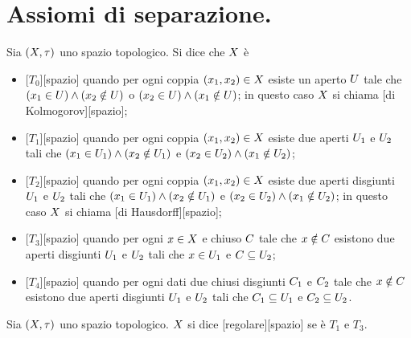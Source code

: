 \section{Assiomi di separazione.}\label{AssiomiDiSeparazione}
\begin{Axiom}
	Sia $(X,\tau)$ uno spazio topologico.
	Si dice che $X$ \`e
	\begin{itemize}
		\item {}[$T_0$][spazio]
		quando per ogni coppia $(x_1,x_2) \in
		X$ esiste un aperto $U$ tale che
		$\left ( x_1 \in U \right ) \wedge \left ( x_2 \notin U \right )$ o
		$\left ( x_2 \in U \right ) \wedge \left ( x_1 \notin U \right )$; in questo
		caso $X$ si chiama
		[di Kolmogorov][spazio];
		\item {}[$T_1$][spazio]
		quando per ogni coppia $(x_1,x_2) \in
		X$ esiste due aperti $U_1$ e $U_2$
		tali che
		$\left ( x_1 \in U_1 \right ) \wedge \left ( x_2 \notin U_1 \right )$ e
		$\left ( x_2 \in U_2 \right ) \wedge \left ( x_1 \notin U_2 \right )$;
		\item {}[$T_2$][spazio]
		quando per ogni coppia $(x_1,x_2) \in
		X$ esiste due aperti disgiunti $U_1$ e
		$U_2$ tali che
		$\left ( x_1 \in U_1 \right ) \wedge \left ( x_2 \notin U_1 \right )$ e
		$\left ( x_2 \in U_2 \right ) \wedge \left ( x_1 \notin U_2 \right )$; in questo
		caso $X$ si chiama
		[di Hausdorff][spazio];
		\item {}[$T_3$][spazio] quando per ogni
		$x \in X$ e chiuso $C$ tale che
		$x \notin C$ esistono due aperti disgiunti $U_1$
		e $U_2$ tali che $x \in U_1$ e $C
		\subseteq U_2$;
		\item {}[$T_4$][spazio] quando per ogni
		dati due chiusi disgiunti $C_1$ e $C_2$ tale
		che $x \notin C$ esistono due aperti disgiunti
		$U_1$ e $U_2$ tali che $C_1 \subseteq
		U_1$ e $C_2 \subseteq U_2$.
	\end{itemize}
\end{Axiom}
\begin{Definition}
	Sia $(X,\tau)$ uno spazio topologico.
	$X$ si dice [regolare][spazio] se
	\`e $T_1$ e $T_3$.
\end{Definition}
